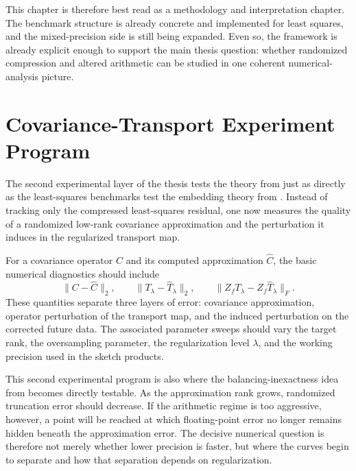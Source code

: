 This chapter is therefore best read as a methodology
and interpretation chapter. The benchmark structure is already concrete and
implemented for least squares, and the mixed-precision side is still being
expanded. Even so, the framework is already explicit enough to support the main
thesis question: whether randomized compression and altered arithmetic can be
studied in one coherent numerical-analysis picture.

\section{Covariance-Transport Experiment Program}

The second experimental layer of the thesis tests the theory from
 just as directly as the least-squares benchmarks test
the embedding theory from . Instead of tracking only the
compressed least-squares residual, one now measures the quality of a
randomized low-rank covariance approximation and the perturbation it induces in
the regularized transport map.

For a covariance operator \(C\) and its computed approximation \(\widehat C\), the
basic numerical diagnostics should include
\[
	\|C - \widehat C\|_2,
	\qquad
	\|T_\lambda - \widehat T_\lambda\|_2,
	\qquad
	\|Z_f T_\lambda - Z_f \widehat T_\lambda\|_F.
\]
These quantities separate three layers of error: covariance approximation,
operator perturbation of the transport map, and the induced perturbation on the
corrected future data. The associated parameter sweeps should vary the target
rank, the oversampling parameter, the regularization level \(\lambda\), and the
working precision used in the sketch products.

This second experimental program is also where the balancing-inexactness idea
from  becomes directly testable. As the approximation
rank grows, randomized truncation error should decrease. If the arithmetic regime
is too aggressive, however, a point will be reached at which floating-point error no
longer remains hidden beneath the approximation error. The decisive numerical
question is therefore not merely whether lower precision is faster, but where the
curves begin to separate and how that separation depends on regularization.

